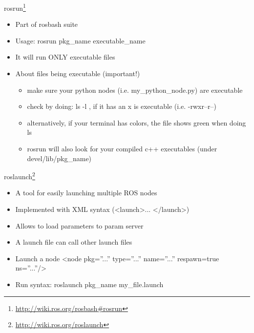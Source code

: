 \documentclass{beamer}
\begin{document}

\begin{frame}{rosrun\footnote{\url{http://wiki.ros.org/rosbash\#rosrun}}}
	\begin{itemize}
		\item Part of rosbash suite
		\item Usage: rosrun pkg\_name executable\_name
		\item It will run ONLY executable files
		\item About files being executable (important!)
		\begin{itemize}
			\item make sure your python nodes (i.e. my\_python\_node.py) are executable
			\item check by doing: ls -l , if it has an x is executable (i.e. -rwxr--r--)
			\item alternatively, if your terminal has colors, the file shows green when doing ls
			\item rosrun will also look for your compiled c++ executables (under devel/lib/pkg\_name)
		\end{itemize}
	\end{itemize}
	
\end{frame}


\begin{frame}{roslaunch\footnote{\url{http://wiki.ros.org/roslaunch}}}
	
	\begin{itemize}
		\item A tool for easily launching multiple ROS nodes
		\item Implemented with XML syntax (\textless launch\textgreater ... \textless /launch\textgreater)
		\item Allows to load parameters to param server
		\item A launch file can call other launch files
		\item Launch a node \textless node pkg=”...” type=”...” name=”...” respawn=true ns=”...”/\textgreater
		\item Run syntax: roslaunch pkg\_name my\_file.launch
	\end{itemize}
	
\end{frame}

\end{document}
